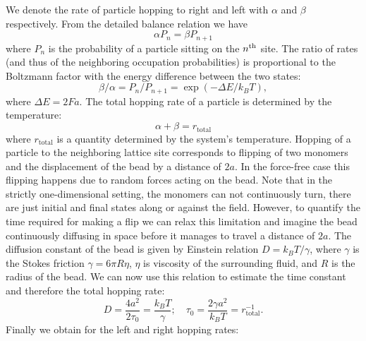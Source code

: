 \documentclass[aps,showpacs,twocolumn,floatfix,prx,superscriptaddress]{revtex4-1}
\begin{document}
 We denote the rate of particle hopping to right and left with $\alpha$ and
 $\beta$ respectively. From the detailed balance relation we have 
\begin{equation}
    \alpha P_{n} = \beta P_{n+1} \label{eq:db}
\end{equation}
where $P_{n}$ is the probability of a particle sitting on the $n^{\rm{th}}$
site. The ratio of rates (and thus of the neighboring occupation probabilities)
is proportional to the Boltzmann factor with the energy difference between the
two states:
\begin{equation}
    \beta / \alpha = P_{n} / P_{n+1} = \exp{(-\Delta E / k_B T)},  \label{eq:r_divide_l}
\end{equation}
where  $\Delta E = 2Fa$.
The total hopping rate of a particle is determined by the temperature:
\begin{equation}
    \alpha + \beta = r_{\text{total}} \label{eq:l_plus_r}
\end{equation}
where $r_{\text{total}}$ is a quantity determined by the system's temperature.
Hopping of a particle to the neighboring lattice site corresponds to flipping of
two monomers and the displacement of the bead by a distance of $2a$. In the
force-free case this flipping happens due to random forces acting on the bead.
Note that in the strictly one-dimensional setting, the monomers can not
continuously turn, there are just initial and final states along or against the
field. However, to quantify the time required for making a flip we can relax
this limitation and imagine the bead continuously diffusing in space before it
manages to travel a distance of $2a$. The diffusion constant of the bead is
given by Einstein relation $D=k_{B}T/\gamma$, where $\gamma$ is the Stokes
friction $\gamma=6\pi R\eta$, $\eta$ is viscosity of the surrounding fluid, and
$R$ is the radius of the bead. We can now use this relation to estimate the time
constant and therefore the total hopping rate:
\begin{equation}
D=\frac{4a^2}{2\tau_0}=\frac{k_{B}T}{\gamma}; \quad \tau_0=\frac{2\gamma a^2}{k_{B}T}=r_{\text{total}}^{-1}.
\end{equation}
Finally we obtain for the left and right hopping rates:
\end{document}
